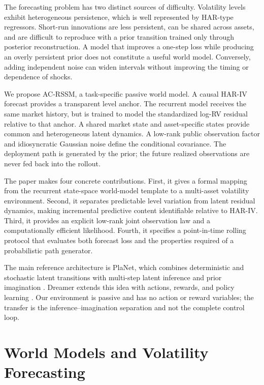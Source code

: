 \documentclass[11pt]{article}
\begin{document}
The forecasting problem has two distinct sources of difficulty. Volatility levels exhibit heterogeneous persistence, which is well represented by HAR-type regressors. Short-run innovations are less persistent, can be shared across assets, and are difficult to reproduce with a prior transition trained only through posterior reconstruction. A model that improves a one-step loss while producing an overly persistent prior does not constitute a useful world model. Conversely, adding independent noise can widen intervals without improving the timing or dependence of shocks.

We propose AC-RSSM, a task-specific passive world model. A causal HAR-IV forecast provides a transparent level anchor. The recurrent model receives the same market history, but is trained to model the standardized log-RV residual relative to that anchor. A shared market state and asset-specific states provide common and heterogeneous latent dynamics. A low-rank public observation factor and idiosyncratic Gaussian noise define the conditional covariance. The deployment path is generated by the prior; the future realized observations are never fed back into the rollout.

The paper makes four concrete contributions. First, it gives a formal mapping from the recurrent state-space world-model template to a multi-asset volatility environment. Second, it separates predictable level variation from latent residual dynamics, making incremental predictive content identifiable relative to HAR-IV. Third, it provides an explicit low-rank joint observation law and a computationally efficient likelihood. Fourth, it specifies a point-in-time rolling protocol that evaluates both forecast loss and the properties required of a probabilistic path generator.

The main reference architecture is PlaNet, which combines deterministic and stochastic latent transitions with multi-step latent inference and prior imagination \cite{planet}. Dreamer extends this idea with actions, rewards, and policy learning \cite{dreamer}. Our environment is passive and has no action or reward variables; the transfer is the inference--imagination separation and not the complete control loop.

\section{World Models and Volatility Forecasting}
\end{document}
